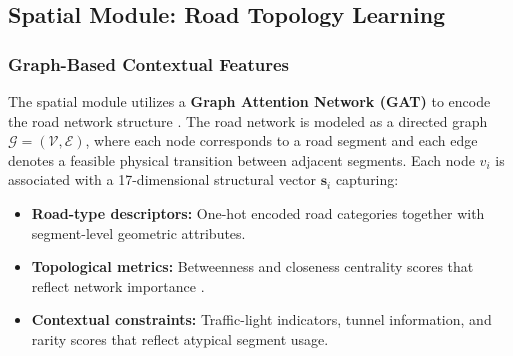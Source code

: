 \documentclass[journal]{IEEEtran}
\begin{document}
\begin{table}[!htbp]
  \centering
  \caption{Summary of LSTM branch configuration}
  \label{tab:lstm_config}
  \renewcommand{\arraystretch}{1.15}
\end{table}

\subsection{Spatial Module: Road Topology Learning}

\subsubsection{Graph-Based Contextual Features}
The spatial module utilizes a \textbf{Graph Attention Network (GAT)} to encode the road network structure \cite{zhang_automatic_2022, li_graph_2023, zhong_multi-factor_2025}. The road network is modeled as a directed graph $\mathcal{G} = (\mathcal{V}, \mathcal{E})$, where each node corresponds to a road segment and each edge denotes a feasible physical transition between adjacent segments. Each node $v_i$ is associated with a 17-dimensional structural vector $\mathbf{s}_i$ capturing:
\begin{itemize}
  \item \textbf{Road-type descriptors:} One-hot encoded road categories together with segment-level geometric attributes.
  \item \textbf{Topological metrics:} Betweenness and closeness centrality scores that reflect network importance \cite{zhong_multi-factor_2025}.
  \item \textbf{Contextual constraints:} Traffic-light indicators, tunnel information, and rarity scores that reflect atypical segment usage.
\end{itemize}
\end{document}
